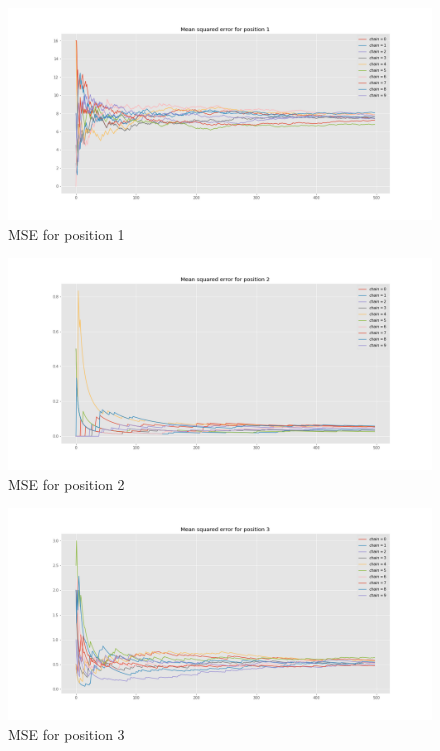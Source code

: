 \documentclass[]{article}
\begin{document}
	\begin{figure}[H]
		\begin{center}
			
			\includegraphics[width=1\textwidth]{task4/figures/T_2_4/Q2/mse_pos1.png}
			\caption*{MSE for position 1}
		\end{center}
	\end{figure}
	
	\begin{figure}[H]
		\begin{center}
			
			\includegraphics[width=1\textwidth]{task4/figures/T_2_4/Q2/mse_pos2.png}
			\caption*{MSE for position 2}
		\end{center}
	\end{figure}
	
	\begin{figure}[H]
		\begin{center}
			
			\includegraphics[width=1\textwidth]{task4/figures/T_2_4/Q2/mse_pos3.png}
			\caption*{MSE for position 3}
		\end{center}
	\end{figure}
	
\end{document}
